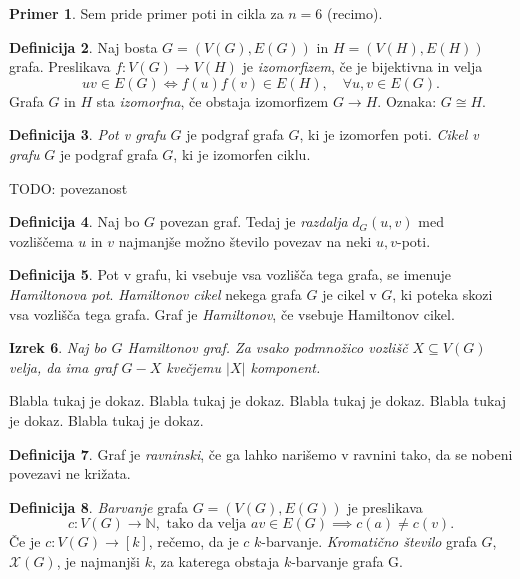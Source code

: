 \documentclass[12pt,a4paper]{amsart}
\theoremstyle{definition} %
\newtheorem{definicija}{Definicija}[section]
\newtheorem{primer}[definicija]{Primer}
\theoremstyle{plain} %
\newtheorem{izrek}[definicija]{Izrek}
\newcommand{\N}{\mathbb N}
\newcommand{\graf}[1]{\ensuremath{#1 = (V(#1), E(#1))}}
\begin{document}
\begin{primer}
	Sem pride primer poti in cikla za $n=6$ (recimo).
\end{primer}

\begin{definicija}
	Naj bosta $\graf{G}$ in $\graf{H}$ grafa. 
	Preslikava $f\colon V(G) \longrightarrow V(H)$ je \emph{izomorfizem}, če je bijektivna in velja
	\[ uv \in E(G) \iff f(u)f(v) \in E(H),\quad \forall u, v \in E(G). \]
	Grafa $G$ in $H$ sta \emph{izomorfna}, če obstaja izomorfizem $G \longrightarrow H$. Oznaka: $G \cong H$.
\end{definicija}

\begin{definicija}
	\emph{Pot v grafu} $G$ je podgraf grafa $G$, ki je izomorfen poti.
	\emph{Cikel v grafu} $G$ je podgraf grafa $G$, ki je izomorfen ciklu. 
\end{definicija}

TODO: povezanost

\begin{definicija}
	Naj bo $G$ povezan graf. Tedaj je \emph{razdalja} $d_G(u,v)$ med vozliščema $u$ in $v$ najmanjše možno število povezav na neki $u,v$-poti.
\end{definicija}

\begin{definicija}
	Pot v grafu, ki vsebuje vsa vozlišča tega grafa, se imenuje \emph{Hamiltonova pot}.
	\emph{Hamiltonov cikel} nekega grafa $G$ je cikel v $G$, ki poteka skozi vsa vozlišča tega grafa.
	Graf je \emph{Hamiltonov}, če vsebuje Hamiltonov cikel.
\end{definicija}

\begin{izrek}
	Naj bo $G$ Hamiltonov graf. Za vsako podmnožico vozlišč $X \subseteq V(G)$ velja, da ima graf $G - X$ kvečjemu $|X|$ komponent.
\end{izrek}

\proof
	Blabla tukaj je dokaz. Blabla tukaj je dokaz. Blabla tukaj je dokaz. Blabla tukaj je dokaz. Blabla tukaj je dokaz.
\endproof

\begin{definicija}
	Graf je \emph{ravninski}, če ga lahko narišemo v ravnini tako, da se nobeni povezavi ne križata.
\end{definicija}

\begin{definicija}
	\emph{Barvanje} grafa $\graf{G}$ je preslikava 
	\[ c\colon V(G) \longrightarrow \N, \text{ tako da velja } av \in E(G) \implies c(a) \neq c(v). \]
	Če je $c\colon V(G) \longrightarrow [k]$, rečemo, da je $c$ $k$-barvanje. \emph{Kromatično število} grafa $G$, $\mathcal{X}(G)$, je najmanjši $k$, za katerega obstaja $k$-barvanje grafa G.
\end{definicija}

\begin{thebibliography}{99}


\end{thebibliography}
\end{document}
